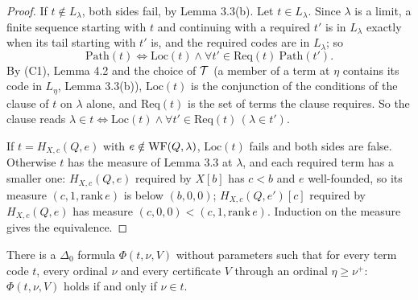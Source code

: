 \documentclass[11pt]{article}
\begin{document}
\begin{proof}
If $t \notin L_\lambda$, both sides fail, by Lemma 3.3(b). Let $t \in L_\lambda$. Since $\lambda$ is a limit, a finite
sequence starting with $t$ and continuing with a required $t'$ is in $L_\lambda$ exactly when its tail starting with
$t'$ is, and the required codes are in $L_\lambda$; so
\[ \mathrm{Path}(t) \iff \mathrm{Loc}(t) \wedge \forall t' \in \mathrm{Req}(t)\ \mathrm{Path}(t'). \]
By (C1), Lemma 4.2 and the choice of $\mathcal{T}$ (a member of a term at $\eta$ contains its code in $L_\eta$, Lemma 3.3(b)),
$\mathrm{Loc}(t)$ is the conjunction of the conditions of the clause of $t$ on $\lambda$ alone, and $\mathrm{Req}(t)$
is the set of terms the clause requires. So the clause reads $\lambda \in t \iff \mathrm{Loc}(t) \wedge \forall t' \in
\mathrm{Req}(t)\, (\lambda \in t')$.

If $t = H_{X,c}(Q,e)$ with $e \notin \mathrm{WF}(Q,\lambda)$, $\mathrm{Loc}(t)$ fails and both sides are false. Otherwise $t$ has
the measure of Lemma 3.3 at $\lambda$, and each required term has a smaller one: $H_{X,c}(Q,e)$ required by $X[b]$ has
$c < b$ and $e$ well-founded, so its measure $(c, 1, \mathrm{rank}\, e)$ is below $(b, 0, 0)$; $H_{X,c}(Q,e')[c]$
required by $H_{X,c}(Q,e)$ has measure $(c, 0, 0) < (c, 1, \mathrm{rank}\, e)$. Induction on the measure gives the
equivalence.
\end{proof}

\begin{statement} There is a $\Delta_0$ formula $\Phi(t,
\nu, V)$ without parameters such that for every term code $t$, every ordinal $\nu$ and every certificate $V$ through an
ordinal $\eta \ge \nu^+$: $\Phi(t, \nu, V)$ holds if and only if $\nu \in t$.
\end{statement}
\end{document}
